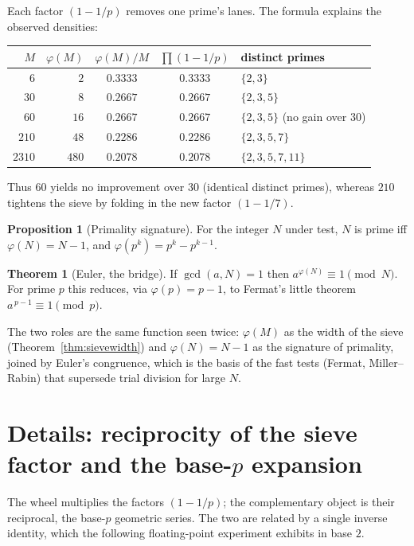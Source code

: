 \documentclass[11pt]{article}
\theoremstyle{definition}
\newtheorem{proposition}{Proposition}
\newtheorem{theorem}{Theorem}
\begin{document}
Each factor $(1-1/p)$ removes one prime's lanes. The formula explains the
observed densities:

\begin{center}
\begin{tabular}{r r c c l}
\hline
$M$ & $\varphi(M)$ & $\varphi(M)/M$ & $\prod(1-1/p)$ & distinct primes\\
\hline
$6$    & $2$   & $0.3333$ & $0.3333$ & $\{2,3\}$\\
$30$   & $8$   & $0.2667$ & $0.2667$ & $\{2,3,5\}$\\
$60$   & $16$  & $0.2667$ & $0.2667$ & $\{2,3,5\}$ (no gain over $30$)\\
$210$  & $48$  & $0.2286$ & $0.2286$ & $\{2,3,5,7\}$\\
$2310$ & $480$ & $0.2078$ & $0.2078$ & $\{2,3,5,7,11\}$\\
\hline
\end{tabular}
\end{center}

\noindent Thus $60$ yields no improvement over $30$ (identical distinct primes),
whereas $210$ tightens the sieve by folding in the new factor $(1-1/7)$.

\begin{proposition}[Primality signature]
For the integer $N$ under test, $N$ is prime iff $\varphi(N)=N-1$, and
$\varphi(p^k)=p^k-p^{k-1}$.
\end{proposition}

\begin{theorem}[Euler, the bridge]
If $\gcd(a,N)=1$ then $a^{\varphi(N)}\equiv 1 \pmod N$. For prime $p$ this
reduces, via $\varphi(p)=p-1$, to Fermat's little theorem
$a^{\,p-1}\equiv 1 \pmod p$.
\end{theorem}

The two roles are the same function seen twice: $\varphi(M)$ as the width of the
sieve (Theorem~\ref{thm:sievewidth}) and $\varphi(N)=N-1$ as the signature of
primality, joined by Euler's congruence, which is the basis of the fast tests
(Fermat, Miller--Rabin) that supersede trial division for large $N$.

\section{Details: reciprocity of the sieve factor and the base-\texorpdfstring{$p$}{p} expansion}

The wheel multiplies the factors $(1-1/p)$; the complementary object is their
reciprocal, the base-$p$ geometric series. The two are related by a single
inverse identity, which the following floating-point experiment exhibits in
base $2$.
\end{document}
